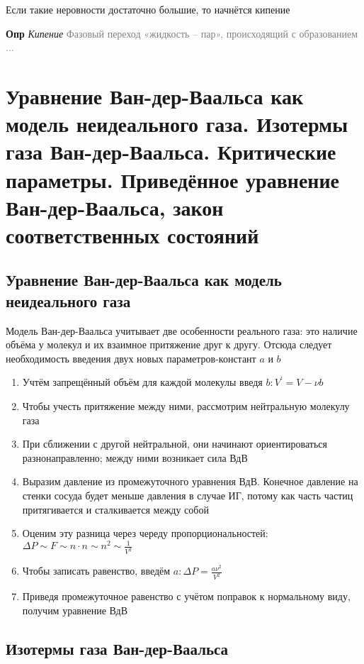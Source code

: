 \documentclass[a4paper, 14pt]{article}
\begin{document}
    Если такие неровности достаточно большие, то начнётся кипение

    \textbf{Опр} \textit{Кипение} \textcolor{gray}{Фазовый переход «жидкость -- пар», происходящий с образованием ...}

    \section{Уравнение Ван-дер-Ваальса как модель неидеального газа.
    Изотермы газа Ван-дер-Ваальса.
    Критические параметры.
    Приведённое уравнение Ван-дер-Ваальса, закон соответственных состояний}

    \subsection{Уравнение Ван-дер-Ваальса как модель неидеального газа}

    Модель Ван-дер-Ваальса учитывает две особенности реального газа: это наличие объёма у молекул и их взаимное
    притяжение друг к другу.
    Отсюда следует необходимость введения двух новых параметров-констант $a$ и $b$

    \begin{enumerate}
        \item Учтём запрещённый объём для каждой молекулы введя $b: V^{'} = V - \nu b$
        \item Чтобы учесть притяжение между ними, рассмотрим нейтральную молекулу газа
        \item При сближении с другой нейтральной, они начинают ориентироваться разнонаправленно; между ними возникает
        сила ВдВ
        \item Выразим давление из промежуточного уравнения ВдВ.
        Конечное давление на стенки сосуда будет меньше давления в случае ИГ, потому как часть частиц притягивается и
        сталкивается между собой
        \item Оценим эту разница через череду пропорциональностей: $\Delta P \sim F \sim n \cdot n \sim n^2 \sim \frac{1}{V^2}$
        \item Чтобы записать равенство, введём $a: \Delta P = \frac{a \nu^2}{V^2}$
        \item Приведя промежуточное равенство с учётом поправок к нормальному виду, получим уравнение ВдВ
    \end{enumerate}

    \subsection{Изотермы газа Ван-дер-Ваальса}
\end{document}
